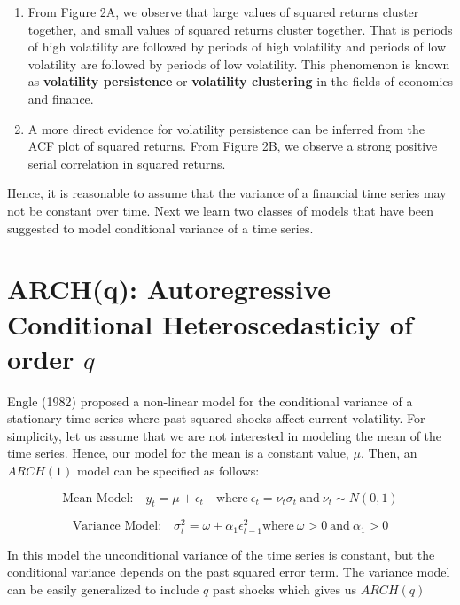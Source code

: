 \documentclass[]{book}
\theoremstyle{definition}
\theoremstyle{definition}
\theoremstyle{definition}
\theoremstyle{remark}
\begin{document}
\begin{enumerate}
\def\labelenumi{\arabic{enumi}.}
\item
  From Figure 2A, we observe that large values of squared returns cluster together, and small values of squared returns cluster together. That is periods of high volatility are followed by periods of high volatility and periods of low volatility are followed by periods of low volatility. This phenomenon is known as \textbf{volatility persistence} or \textbf{volatility clustering} in the fields of economics and finance.
\item
  A more direct evidence for volatility persistence can be inferred from the ACF plot of squared returns. From Figure 2B, we observe a strong positive serial correlation in squared returns.
\end{enumerate}

Hence, it is reasonable to assume that the variance of a financial time series may not be constant over time. Next we learn two classes of models that have been suggested to model conditional variance of a time series.

\hypertarget{archq-autoregressive-conditional-heteroscedasticiy-of-order-q}{%
\section{\texorpdfstring{ARCH(q): Autoregressive Conditional Heteroscedasticiy of order \(q\)}{ARCH(q): Autoregressive Conditional Heteroscedasticiy of order q}}\label{archq-autoregressive-conditional-heteroscedasticiy-of-order-q}}

Engle (1982) proposed a non-linear model for the conditional variance of a stationary time series where past squared shocks affect current volatility. For simplicity, let us assume that we are not interested in modeling the mean of the time series. Hence, our model for the mean is a constant value, \(\mu\). Then, an \(ARCH(1)\) model can be specified as follows:

\[\text{Mean Model:} \quad y_t = \mu +\epsilon_t \quad \text{where} \ \epsilon_t=\nu_t  \sigma_t \ \text{and} \ \nu_t\sim N(0,1)\]

\[\text{Variance Model:} \quad  \sigma_t^2=\omega +\alpha_1 \epsilon_{t-1}^2 \text{where} \ \omega>0 \ \text{and} \ \alpha_1>0 \]

In this model the unconditional variance of the time series is constant, but the conditional variance depends on the past squared error term. The variance model can be easily generalized to include \(q\) past shocks which gives us \(ARCH(q)\)
\end{document}
